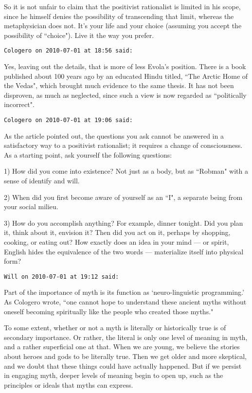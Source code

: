 \begin{footnotesize}
\begin{sffamily}
So it is not unfair to claim that the positivist rationalist is limited in his scope, since he himself denies the possibility of transcending that limit, whereas the metaphysician does not. It's your life and your choice (assuming you accept the possibility of ``choice"). Live it the way you prefer.


\hfill

\texttt{Cologero on 2010-07-01 at 18:56 said: }

Yes, leaving out the details, that is more of less Evola's position. There is a book published about 100 years ago by an educated Hindu titled, ``The Arctic Home of the Vedas", which brought much evidence to the same thesis. It has not been disproven, as much as neglected, since such a view is now regarded as ``politically incorrect".


\hfill

\texttt{Cologero on 2010-07-01 at 19:06 said: }

As the article pointed out, the questions you ask cannot be answered in a satisfactory way to a positivist rationalist; it requires a change of consciousness. As a starting point, ask yourself the following questions:

1) How did you come into existence? Not just as a body, but as ``Robman" with a sense of identify and will.

2) When did you first become aware of yourself as an ``I", a separate being from your social milieu.

3) How do you accomplish anything? For example, dinner tonight. Did you plan it, think about it, envision it? Then did you act on it, perhaps by shopping, cooking, or eating out? How exactly does an idea in your mind — or spirit, English hides the equivalence of the two words — materialize itself into physical form?


\hfill

\texttt{Will on 2010-07-01 at 19:12 said: }

Part of the importance of myth is its function as `neuro-linguistic programming.' As Cologero wrote, ``one cannot hope to understand these ancient myths without oneself becoming spiritually like the people who created those myths."

To some extent, whether or not a myth is literally or historically true is of secondary importance. Or rather, the literal is only one level of meaning in myth, and a rather superficial one at that. When we are young, we believe the stories about heroes and gods to be literally true. Then we get older and more skeptical, and we doubt that these things could have actually happened. But if we persist in engaging myth, deeper levels of meaning begin to open up, such as the principles or ideals that myths can express.


\end{sffamily}
\end{footnotesize}
